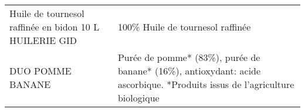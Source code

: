 \begin{longtable}{p{5cm}p{10cm}}
                                                   Huile de tournesol raffinée en bidon 10 L HUILERIE GID &                                                                                                                                                                                                                                                                                                                                                                                                                                                                                                                                                                                                                                                                                                                                                                                                                                                                                                                                                                                                         100\% Huile de tournesol raffinée \\
                                                                                         DUO POMME BANANE &                                                                                                                                                                                                                                                                                                                                                                                                                                                                                                                                                                                                                                                                                                                                                                                                                                                                                                               Purée de pomme* (83\%), purée de banane* (16\%), antioxydant: acide ascorbique.  *Produits issus de l'agriculture biologique \\

\end{longtable}
